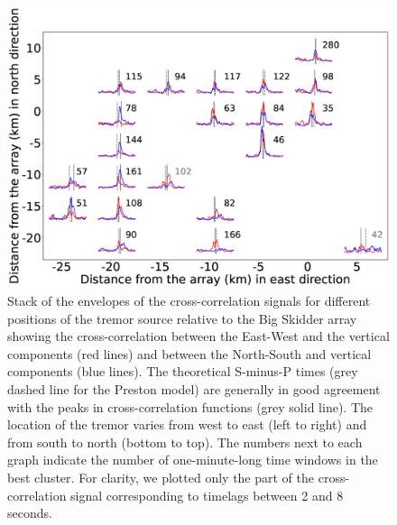 \documentclass[draft]{agujournal2019}
\begin{document}
\begin{figure}
\noindent\includegraphics[width=\textwidth, trim={2.5cm 0.5cm 5cm 1cm},clip]{figures/BS_PWS_PWS_0.eps}
\caption{Stack of the envelopes of the cross-correlation signals for different positions of the tremor source relative to the Big Skidder array showing the cross-correlation between the East-West and the vertical components (red lines) and between the North-South and vertical components (blue lines). The theoretical S-minus-P times (grey dashed line for the Preston model) are generally in good agreement with the peaks in cross-correlation functions (grey solid line). The location of the tremor varies from west to east (left to right) and from south to north (bottom to top). The numbers next to each graph indicate the number of one-minute-long time windows in the best cluster. For clarity, we plotted only the part of the cross-correlation signal corresponding to timelags between 2 and 8 seconds.}
\label{pngfiguresample}
\end{figure}
\end{document}
